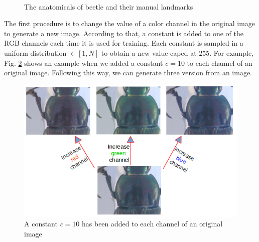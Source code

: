 \documentclass[review]{elsarticle}
\begin{document}
\begin{figure}[htbp]
	~~	
	~~
 \\
    \caption{The anatomicals of beetle and their manual landmarks}
    \label{figbeetles}
\end{figure}

The first procedure is to change the value of a color channel in the original image to generate a new image. According to that, a constant is added to one of the RGB channels each time it is used for training. Each constant is sampled in a uniform distribution $\in [1, N]$ to obtain a new value caped at $255$. For example, Fig. \ref{figaug1} shows an example when we added a constant $c = 10$ to each channel of an original image. Following this way, we can generate three version from an image.

\begin{figure}[h]
	\centering
	\includegraphics[scale=0.35]{images/inc_channels}
	\caption{A constant $c = 10$ has been added to each channel of an original image}
	\label{figaug1}
\end{figure}
\end{document}

